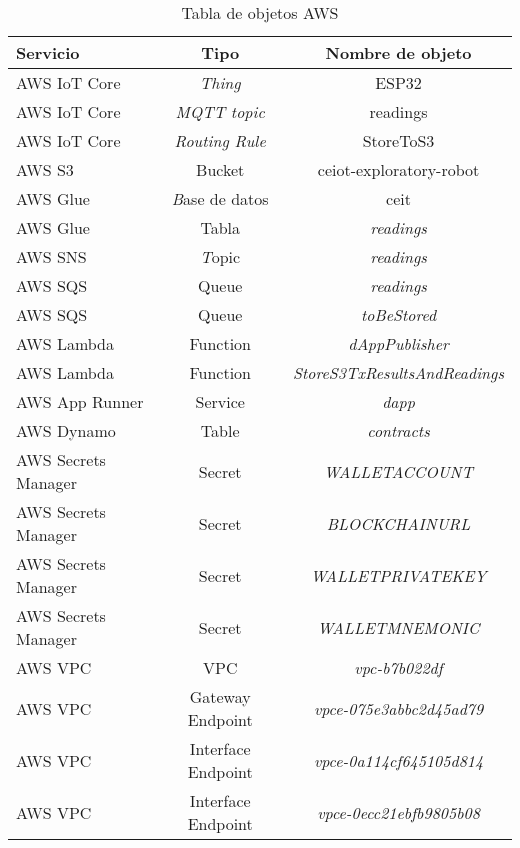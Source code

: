 \begin{table}[h]
	\centering
	\caption[caption corto]{Tabla de objetos AWS}
	\begin{tabular}{l c c}    
		\toprule
		\textbf{Servicio} & \textbf{Tipo} & \textbf{Nombre de objeto}  \\
		\midrule
		AWS IoT Core & \textit{Thing} & ESP32 \\		
		AWS IoT Core & \textit{MQTT topic} & readings \\		
		AWS IoT Core & \textit{Routing Rule} & StoreToS3 \\		
		AWS S3 & Bucket & ceiot-exploratory-robot \\	
		AWS Glue & \textit Base de datos & ceit \\		
		AWS Glue & Tabla & \textit{readings} \\		
		AWS SNS & \textit Topic & \textit{readings} \\		
		AWS SQS & Queue & \textit{readings} \\	
		AWS SQS & Queue & \textit{toBeStored} \\	
		AWS Lambda & Function & \textit{dAppPublisher} \\	
		AWS Lambda & Function & \textit{StoreS3TxResultsAndReadings } \\	
		AWS App Runner & Service & \textit{dapp } \\	
		AWS Dynamo & Table & \textit{contracts} \\	
		AWS Secrets Manager & Secret & \textit{WALLETACCOUNT} \\	
		AWS Secrets Manager & Secret & \textit{BLOCKCHAINURL} \\	
		AWS Secrets Manager & Secret & \textit{WALLETPRIVATEKEY} \\	
		AWS Secrets Manager & Secret & \textit{WALLETMNEMONIC} \\	
		AWS VPC & VPC & \textit{vpc-b7b022df} \\	
		AWS VPC & Gateway Endpoint & \textit{vpce-075e3abbc2d45ad79} \\	
		AWS VPC & Interface Endpoint & \textit{vpce-0a114cf645105d814} \\	
		AWS VPC & Interface Endpoint & \textit{vpce-0ecc21ebfb9805b08} \\	


		\bottomrule
		\hline
	\end{tabular}
	\label{tab:peces}
\end{table}

